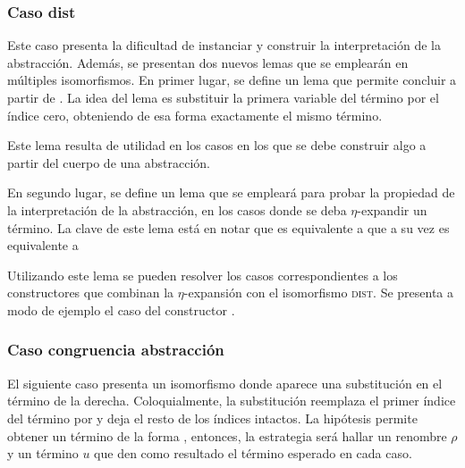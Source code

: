 
\subsubsection{Caso dist}

Este caso presenta la dificultad de instanciar y construir la interpretación de la abstracción.
Además, se presentan dos nuevos lemas que se emplearán en múltiples isomorfismos.
En primer lugar, se define un lema que permite concluir \snstar{} a partir de \snstar {} .
La idea del lema es substituir la primera variable del término por el índice cero, obteniendo de esa forma exactamente el mismo término.


Este lema resulta de utilidad en los casos en los que se debe construir algo a partir del cuerpo de una abstracción.


En segundo lugar, se define un lema que se empleará para probar la propiedad de la interpretación de la abstracción, en los casos donde se deba $\eta$-expandir un término.
La clave de este lema está en notar que 
es equivalente a  que a su vez es equivalente a  \bound{$\rho$} 


Utilizando este lema se pueden resolver los casos correspondientes a los constructores que combinan la $\eta$-expansión con el isomorfismo \textsc{dist}.
Se presenta a modo de ejemplo el caso del constructor .


\subsubsection{Caso congruencia abstracción}

El siguiente caso presenta un isomorfismo donde aparece una substitución en el término de la derecha.
Coloquialmente, la substitución  reemplaza el primer índice del término por
\const{[}  \const{]≡} 
y deja el resto de los índices intactos.
La hipótesis  permite obtener un término de la forma
\snstar
{}
, entonces, la estrategia será hallar un renombre $\rho$ y un término $u$ que den como resultado el término esperado en cada caso.

